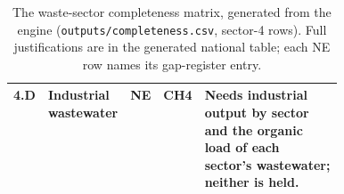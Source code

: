 \begin{table}[htbp]
\begin{tabular}{@{}llclp{0.43\linewidth}@{}}
4.D & Industrial wastewater & NE & CH4 & Needs industrial output by sector and the organic load of each sector's wastewater; neither is held. \\[2pt]
\bottomrule
\end{tabular}
\caption{The waste-sector completeness matrix, generated from the engine
(\texttt{outputs/completeness.csv}, sector-4 rows). Full justifications are
in the generated national table; each NE row names its gap-register entry.}
\label{tab:completeness}
\end{table}
